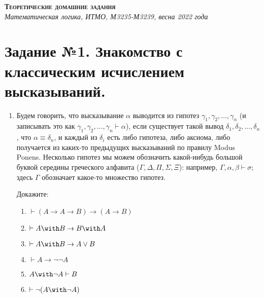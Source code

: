 \documentclass[10pt,a4paper,oneside]{article}
\begin{document}
\begin{center}{\Large\textsc{\textbf{Теоретические домашние задания}}}\\
             \it Математическая логика, ИТМО, М3235-М3239, весна 2022 года\end{center}

\section*{Задание №1. Знакомство с классическим исчислением высказываний.}

\begin{enumerate}

\item Будем говорить, что высказывание $\alpha$ выводится из гипотез $\gamma_1, \gamma_2, \dots, \gamma_n$
(и записывать это как $\gamma_1, \gamma_2, \dots, \gamma_n \vdash \alpha$), если существует
такой вывод $\delta_1, \delta_2, \dots, \delta_n$, что $\alpha\equiv\delta_n$, и каждый из $\delta_i$
есть либо гипотеза, либо аксиома, либо получается из каких-то предыдущих высказываний по правилу
Modus Ponens. Несколько гипотез мы можем обозначить какой-нибудь большой буквой середины греческого 
алфавита ($\Gamma,\Delta,\Pi,\Sigma,\Xi$): например, $\Gamma,\alpha,\beta\vdash\sigma$; здесь
$\Gamma$ обозначает какое-то множество гипотез.



Докажите:
\begin{enumerate}
\item $\vdash (A \rightarrow A \rightarrow B) \rightarrow (A \rightarrow B)$
\item $\vdash A \with B \rightarrow B \with A$
\item $\vdash A \with B \rightarrow A \vee B$
\item $\vdash A \rightarrow \neg \neg A$
\item $A \with \neg A \vdash B$
\item $\vdash \neg (A \with \neg A)$
\end{enumerate}


\end{enumerate}
\end{document}
